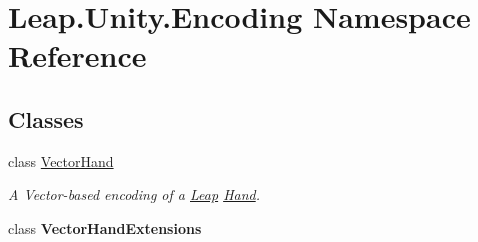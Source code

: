 \hypertarget{namespace_leap_1_1_unity_1_1_encoding}{}\section{Leap.\+Unity.\+Encoding Namespace Reference}
\label{namespace_leap_1_1_unity_1_1_encoding}
\subsection*{Classes}
\begin{DoxyCompactItemize}
\item 
class \mbox{\hyperlink{class_leap_1_1_unity_1_1_encoding_1_1_vector_hand}{Vector\+Hand}}
\begin{DoxyCompactList}\small\item\em A Vector-\/based encoding of a \mbox{\hyperlink{namespace_leap_1_1_unity_1_1_leap}{Leap}} \mbox{\hyperlink{class_leap_1_1_hand}{Hand}}. \end{DoxyCompactList}\item 
class {\bfseries Vector\+Hand\+Extensions}
\end{DoxyCompactItemize}
